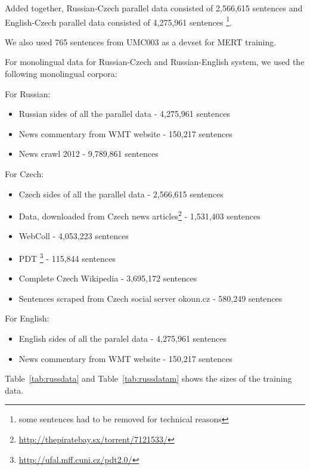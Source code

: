 \documentclass[11pt,letterpaper]{article}
\def\parcite#1{\cite{#1}}  %
\def\Tref#1{Table~\ref{#1}}
\def\parcite#1{\cite{#1}}
\begin{document}
Added together, Russian-Czech parallel data consisted of 2,566,615 sentences and English-Czech parallel data consisted of 4,275,961 sentences \footnote{some sentences had to be removed for technical reasons}.

We also used 765 sentences from UMC003 as a devset for MERT training.

For monolingual data for Russian-Czech and Russian-English system, we used the following monolingual corpora:

For Russian:
\begin{itemize}
\item Russian sides of all the parallel data - 4,275,961 sentences
\item News commentary from WMT website - 150,217 sentences
\item News crawl 2012 - 9,789,861 sentences
\end{itemize}

For Czech:
\begin{itemize}
\item Czech sides of all the parallel data - 2,566,615 sentences
\item Data, downloaded from Czech news articles\footnote{\url{http://thepiratebay.sx/torrent/7121533/}} - 1,531,403 sentences
\item WebColl \parcite{webcoll} - 4,053,223 sentences
\item PDT \footnote{\url{http://ufal.mff.cuni.cz/pdt2.0/}} - 115,844 sentences
\item Complete Czech Wikipedia - 3,695,172 sentences
\item Sentences scraped from Czech social server okoun.cz - 580,249 sentences
\end{itemize}

For English:
\begin{itemize}
\item English sides of all the paralel data - 4,275,961 sentences
\item News commentary from WMT website - 150,217 sentences
\end{itemize}

\Tref{tab:russdata} and \Tref{tab:russdatam} shows the sizes of the training data.
\end{document}
